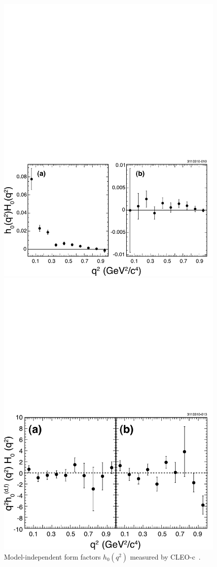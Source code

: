 \begin{figure}[htb]
  \begin{center}
    \vskip0.20in
    \includegraphics[width=4.in,angle=0., bb= -3 -3 598 330]{figures/charm/sl_cleoc_h0.pdf}
  \end{center}
  \begin{center}
    \vskip0.20in
    \includegraphics[width=4.in,angle=0., bb= -3 -3 598 390]{figures/charm/sl_cleoc_h0df.pdf}
  \end{center}
\vskip-0.20in
  \caption{Model-independent form factors $h_0(q^2)$ measured by 
    CLEO-c~\cite{Briere:2010zc}.
  \label{fig:cleoc_h0}}
\end{figure}

